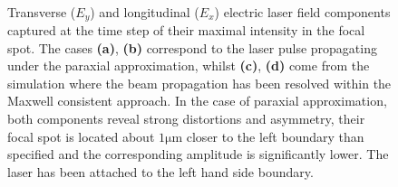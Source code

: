 \begin{figure}[h!]
	\centering
	\hspace{2mm}
	\\
	\hspace{2mm}
	\caption{Transverse ($ E_{y} $) and longitudinal ($ E_{x} $) electric laser field components captured at the time step of their maximal intensity in the focal spot. The cases \textbf{(a)}, \textbf{(b)} correspond to the laser pulse propagating under the paraxial approximation, whilst \textbf{(c)}, \textbf{(d)} come from the simulation where the beam propagation has been resolved within the Maxwell consistent approach. In the case of paraxial approximation, both components reveal strong distortions and asymmetry, their focal spot is located about $ \mathrm{1 \mu m} $ closer to the left boundary than specified and the corresponding amplitude is significantly lower. The laser has been attached to the left hand side boundary.}
	\label{fig:1}
\end{figure}


